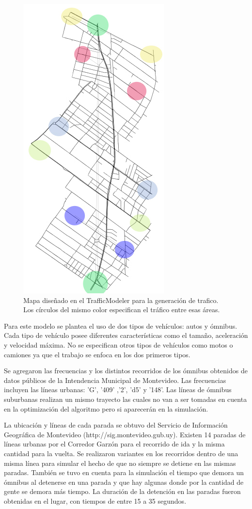 \begin{figure}[h]
	\centering
	\includegraphics[width=0.4\linewidth]{Figures/areaflow1}
	\caption[Mapa diseñado en el TrafficModeler para la generación de tráfico.]{Mapa diseñado en el TrafficModeler para la generación de trafico. Los círculos del mismo color especifican el tráfico entre esas áreas. }
	\label{fig:areaflow1}
\end{figure}


Para este modelo se plantea el uso de dos tipos de vehículos: autos y ómnibus. Cada tipo de vehículo posee diferentes características como el tamaño, aceleración y velocidad máxima. No se especifican otros tipos de vehículos como motos o camiones ya que el trabajo se enfoca en los dos primeros tipos.

Se agregaron las frecuencias y los distintos recorridos de los ómnibus obtenidos de datos públicos de la Intendencia Municipal de Montevideo. Las frecuencias incluyen las líneas urbanas: 'G', '409' ,'2', 'd5'  y  '148'. Las líneas de ómnibus suburbanas realizan  un mismo  trayecto las cuales no van a ser tomadas en cuenta en la optimización del algoritmo pero si aparecerán en la simulación.

La ubicación y líneas de cada parada se obtuvo del Servicio de Información Geográfica de Montevideo (http://sig.montevideo.gub.uy). Existen 14 paradas de líneas urbanas por el Corredor Garzón para el recorrido de ida y la misma cantidad para la vuelta. Se realizaron variantes en los recorridos dentro de una misma línea para simular el hecho de que no siempre se detiene en las mismas paradas. También se tuvo en cuenta para la simulación el tiempo que demora un ómnibus al detenerse en una parada y que hay algunas donde por la cantidad de gente se demora más tiempo. La duración de la detención en las paradas fueron obtenidas en el lugar, con tiempos de entre 15 a 35 segundos.

